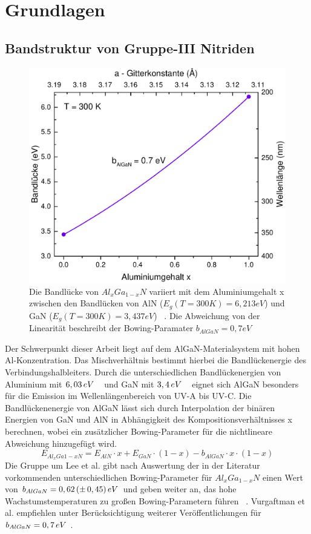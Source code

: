 \chapter{Grundlagen}
\thispagestyle{fancy}

\section{Bandstruktur von Gruppe-III Nitriden}
\begin{figure}[!htb]
    \centering
    \begin{minipage}[t]{\linewidth}
        \centering
        \includegraphics[width=0.5\linewidth]{Bilder/bandluecke.pdf}
        \caption{Die Bandlücke von $Al_{x}Ga_{1-x}N$ variiert mit dem Aluminiumgehalt x zwischen den Bandlücken von AlN ($E_{g}(T = 300 K) = 6,213 eV$) und GaN ($E_{g}(T = 300 K) = 3,437 eV$) ~\cite{pipr}. Die Abweichung von der Linearität beschreibt der Bowing-Paramater $b_{AlGaN} = 0,7 eV$} 
        \label{fig:wurtz}
    \end{minipage}%
\end{figure}
\noindent
Der Schwerpunkt dieser Arbeit liegt auf dem AlGaN-Materialsystem mit hohen Al-Konzentration. Das Mischverhältnis bestimmt hierbei die Bandlückenergie des Verbindungshalbleiters. Durch die unterschiedlichen Bandlückenergien von Aluminium mit $6,03 \thinspace eV$ ~\cite{fenaln} und GaN mit $3,4 \thinspace eV$ ~\cite{pipr} eignet sich AlGaN besonders für die Emission im Wellenlängenbereich von UV-A bis UV-C. 
Die Bandlückenenergie von AlGaN lässt sich durch Interpolation der binären Energien von GaN und AlN in Abhängigkeit des Kompositionsverhältnisses x berechnen, wobei ein zusätzlicher Bowing-Parameter für die nichtlineare Abweichung hinzugefügt wird. 
%
\begin{equation}
    E_{Al_{x}Ga{1-x}N} = E_{AlN} \cdot x + E_{GaN} \cdot (1-x) - b_{AlGaN} \cdot x \cdot (1-x) 
\end{equation}
%
Die Gruppe um Lee et al. gibt nach Auswertung der in der Literatur vorkommenden unterschiedlichen Bowing-Parameter für $Al_{x}Ga_{1-x}N$ einen Wert von $b_{AlGaN} = 0,62\thinspace(\pm \thinspace 0,45)\thinspace eV$ und geben weiter an, das hohe Wachstumstemperaturen zu großen Bowing-Parametern führen ~\cite{doi:10.1063/1.123339}.
Vurgaftman et al. empfiehlen unter Berücksichtigung weiterer Veröffentlichungen für $b_{AlGaN} =  0,7 \thinspace eV$ .



